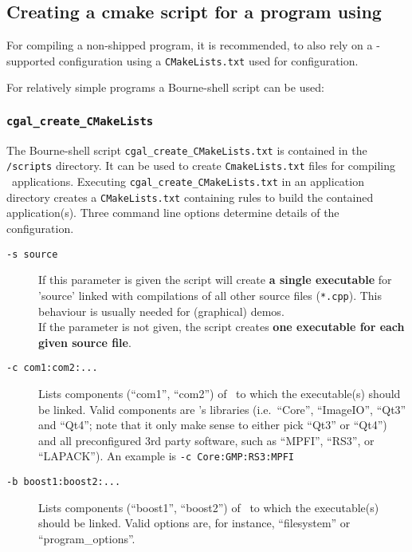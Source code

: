 \subsection{Creating a cmake script for a program using \cgal}

For compiling a non-shipped program, it is
recommended, to also rely on a \cmake-supported configuration using a
\texttt{CMakeLists.txt} used for configuration. 

For relatively simple programs a Bourne-shell script can be
used:

\subsubsection{\texttt{cgal\_create\_CMakeLists\label{sec:create_cgal_CMakeLists}}}

The Bourne-shell script \texttt{cgal\_create\_CMakeLists.txt} is contained in the
\texttt{\cgalrel/scripts} directory. It can be used to create
\texttt{CmakeLists.txt} files for compiling \cgal\ applications. Executing
\texttt{cgal\_create\_CMakeLists.txt} in an application directory creates a
\texttt{CMakeLists.txt} containing rules to build the contained
application(s). Three command line options determine details of the
configuration.

\begin{description}
\item [\texttt{-s source}] If this parameter is given the script will
  create \textbf{a single executable} for 'source' linked with
  compilations of all other source files (\texttt{*.cpp}). This
  behaviour is usually needed for (graphical) demos. \\
  If the parameter is not given, the script creates \textbf{one executable for each given
  source file}.
\item [\texttt{-c com1:com2:...}] Lists components (``com1'',
  ``com2'') of \cgal\ to which the executable(s) should be linked. Valid components are \cgal's
  libraries (i.e.~``Core'', ``ImageIO'', ``Qt3'' and ``Qt4''; note
  that it only make sense to either pick ``Qt3'' or ``Qt4'') and all
  preconfigured 3rd party software, such as ``MPFI'', ``RS3'',
  or ``LAPACK''). An example is \texttt{-c Core:GMP:RS3:MPFI}

\item [\texttt{-b boost1:boost2:...}] Lists components (``boost1'',
  ``boost2'') of \boost\ to which the executable(s) should be
  linked. Valid options are, for instance, ``filesystem'' or ``program\_options''.

\end{description}


